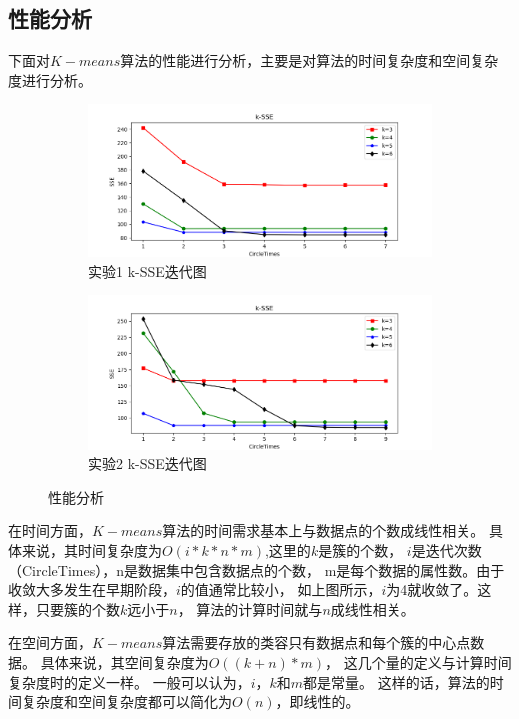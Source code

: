 \documentclass[bachelor,adobefonts]{jnuthesis}
\begin{document}
\subsection{性能分析}
下面对$K-means$算法的性能进行分析，主要是对算法的时间复杂度和空间复杂度进行分析。
\begin{figure}[h!]
  \centering
  \begin{subfigure}[b]{0.8\linewidth}
    \includegraphics[width=\linewidth]{Wct-SSE-first.png}
    \caption{实验1 k-SSE迭代图}
  \end{subfigure}
  \begin{subfigure}[b]{0.8\linewidth}
    \includegraphics[width=\linewidth]{Wct-SSE-second.png}
    \caption{实验2 k-SSE迭代图}
  \end{subfigure}
  \caption{性能分析}
\end{figure}

在时间方面，$K-means$算法的时间需求基本上与数据点的个数成线性相关。
具体来说，其时间复杂度为$O(i*k*n*m)$,这里的$k$是簇的个数，
$i$是迭代次数（CircleTimes），n是数据集中包含数据点的个数，
m是每个数据的属性数。由于收敛大多发生在早期阶段，$i$的值通常比较小，
如上图所示，$i$为4就收敛了。这样，只要簇的个数$k$远小于$n$，
算法的计算时间就与$n$成线性相关。

在空间方面，$K-means$算法需要存放的类容只有数据点和每个簇的中心点数据。
具体来说，其空间复杂度为$O((k+n)*m)$，
这几个量的定义与计算时间复杂度时的定义一样。
一般可以认为，$i$，$k$和$m$都是常量。
这样的话，算法的时间复杂度和空间复杂度都可以简化为$O(n)$，即线性的。
\end{document}
